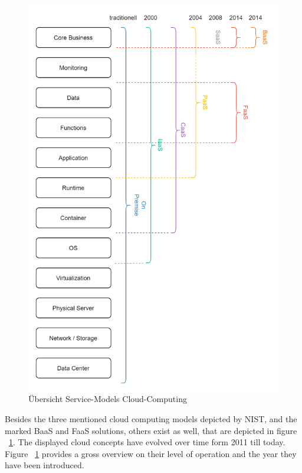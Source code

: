 \documentclass[11pt]{article}
\begin{document}
\begin{figure}[H]
\caption{Übersicht Service-Models Cloud-Computing}
\label{fig:cloudComputingConcepts}
\centering
\includegraphics[angle=90,width=1\textwidth]{serviceModels}
\end{figure}
Besides the three mentioned cloud computing models depicted by NIST, and the marked BaaS and FaaS solutions, others exist as well, that are depicted in figure ~\ref{fig:cloudComputingConcepts}. The displayed cloud concepts have evolved over time form 2011 till today. Figure ~\ref{fig:cloudComputingConcepts} provides a gross overview on their level of operation and the year they have been introduced. 
\end{document}
